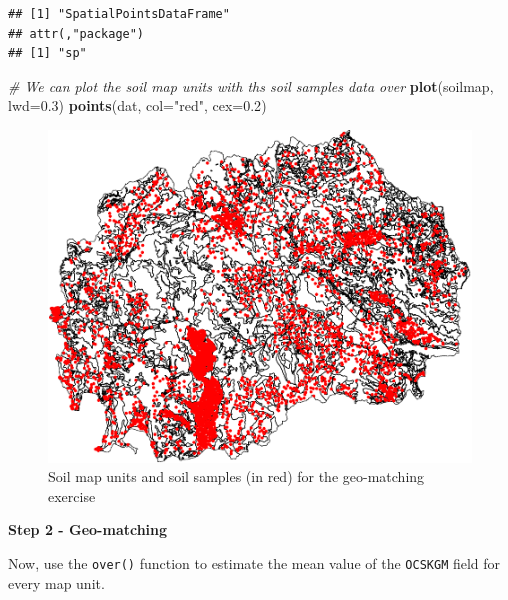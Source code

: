 \documentclass[10pt,b5paper,]{book}
\newenvironment{Shaded}{\begin{snugshade}}{\end{snugshade}}
\newcommand{\CommentTok}[1]{\textcolor[rgb]{0.56,0.35,0.01}{\textit{#1}}}
\newcommand{\DataTypeTok}[1]{\textcolor[rgb]{0.13,0.29,0.53}{#1}}
\newcommand{\DecValTok}[1]{\textcolor[rgb]{0.00,0.00,0.81}{#1}}
\newcommand{\FloatTok}[1]{\textcolor[rgb]{0.00,0.00,0.81}{#1}}
\newcommand{\KeywordTok}[1]{\textcolor[rgb]{0.13,0.29,0.53}{\textbf{#1}}}
\newcommand{\NormalTok}[1]{#1}
\newcommand{\OperatorTok}[1]{\textcolor[rgb]{0.81,0.36,0.00}{\textbf{#1}}}
\newcommand{\StringTok}[1]{\textcolor[rgb]{0.31,0.60,0.02}{#1}}
\theoremstyle{definition}
\theoremstyle{definition}
\theoremstyle{definition}
\theoremstyle{remark}
\begin{document}
\begin{verbatim}
## [1] "SpatialPointsDataFrame"
## attr(,"package")
## [1] "sp"
\end{verbatim}

\begin{Shaded}
\begin{Highlighting}[]
\CommentTok{# We can plot the soil map units with ths soil samples data over}
\KeywordTok{plot}\NormalTok{(soilmap, }\DataTypeTok{lwd=}\FloatTok{0.3}\NormalTok{)}
\KeywordTok{points}\NormalTok{(dat, }\DataTypeTok{col=}\StringTok{"red"}\NormalTok{, }\DataTypeTok{cex=}\FloatTok{0.2}\NormalTok{)}
\end{Highlighting}
\end{Shaded}

\begin{figure}
\centering
\includegraphics{SOCMapping_files/figure-latex/unnamed-chunk-30-1.pdf}
\caption{\label{fig:unnamed-chunk-30}Soil map units and soil samples (in
red) for the geo-matching exercise}
\end{figure}

\textbf{Step 2 - Geo-matching}

Now, use the \texttt{over()} function to estimate the mean value of the
\texttt{OCSKGM} field for every map unit.

\begin{Shaded}
\end{Shaded}
\end{document}
